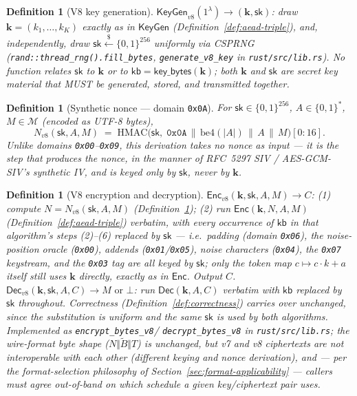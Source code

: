 \documentclass[11pt,a4paper]{article}
\newtheorem{definition}[theorem]{Definition}
\begin{document}
\begin{definition}[V8 key generation]\label{def:keygen-v8}
$\mathsf{KeyGen}_{v8}(1^\lambda) \to (\mathbf{k}, \mathsf{sk})$: draw
$\mathbf{k} = (k_1,\ldots,k_K)$ exactly as in $\mathsf{KeyGen}$
(Definition~\ref{def:aead-triple}), and, \emph{independently}, draw
$\mathsf{sk} \xleftarrow{\$} \{0,1\}^{256}$ uniformly via CSPRNG
(\texttt{rand::thread\_rng().fill\_bytes}, \texttt{generate\_v8\_key} in
\texttt{rust/src/lib.rs}). No function relates $\mathsf{sk}$ to
$\mathbf{k}$ or to $\mathsf{kb}=\mathsf{key\_bytes}(\mathbf{k})$; both
$\mathbf{k}$ and $\mathsf{sk}$ are secret key material that MUST be
generated, stored, and transmitted together.
\end{definition}

\begin{definition}[Synthetic nonce --- domain \texttt{0x0A}]\label{def:synthnonce}
For $\mathsf{sk}\in\{0,1\}^{256}$, $A\in\{0,1\}^{*}$, $M\in\mathcal{M}$
(encoded as UTF-8 bytes),
\[
  N_{v8}(\mathsf{sk}, A, M) \;=\; \mathrm{HMAC}\bigl(\mathsf{sk},\;
    \texttt{0x0A} \,\|\, \mathrm{be4}(|A|) \,\|\, A \,\|\, M\bigr)[0{:}16].
\]
Unlike domains \texttt{0x00}--\texttt{0x09}, this derivation takes no
nonce as input --- it is the step that \emph{produces} the nonce, in the
manner of RFC~5297 SIV / AES-GCM-SIV's synthetic IV, and is keyed only by
$\mathsf{sk}$, never by $\mathbf{k}$.
\end{definition}

\begin{definition}[V8 encryption and decryption]\label{def:aead-triple-v8}
$\mathsf{Enc}_{v8}(\mathbf{k}, \mathsf{sk}, A, M) \to C$: (1) compute
$N = N_{v8}(\mathsf{sk}, A, M)$ (Definition~\ref{def:synthnonce}); (2)
run $\mathsf{Enc}(\mathbf{k}, N, A, M)$ (Definition~\ref{def:aead-triple})
verbatim, with every occurrence of $\mathsf{kb}$ in that algorithm's steps
(2)--(6) replaced by $\mathsf{sk}$ --- i.e.\ padding (domain
\texttt{0x06}), the noise-position oracle (\texttt{0x00}), addends
(\texttt{0x01}/\texttt{0x05}), noise characters (\texttt{0x04}), the
\texttt{0x07} keystream, and the \texttt{0x03} tag are all keyed by
$\mathsf{sk}$; only the token map $c\mapsto c\cdot k+a$ itself still uses
$\mathbf{k}$ directly, exactly as in $\mathsf{Enc}$. Output $C$.
$\mathsf{Dec}_{v8}(\mathbf{k}, \mathsf{sk}, A, C) \to M \text{ or } \bot$:
run $\mathsf{Dec}(\mathbf{k}, A, C)$ verbatim with $\mathsf{kb}$ replaced
by $\mathsf{sk}$ throughout. Correctness
(Definition~\ref{def:correctness}) carries over unchanged, since the
substitution is uniform and the same $\mathsf{sk}$ is used by both
algorithms. Implemented as \texttt{encrypt\_bytes\_v8}/
\texttt{decrypt\_bytes\_v8} in \texttt{rust/src/lib.rs}; the wire-format
byte shape ($N\Vert\widetilde{B}\Vert T$) is unchanged, but v7 and v8
ciphertexts are \emph{not} interoperable with each other (different
keying and nonce derivation), and --- per the format-selection philosophy
of Section~\ref{sec:format-applicability} --- callers must agree
out-of-band on which schedule a given key/ciphertext pair uses.
\end{definition}
\end{document}
